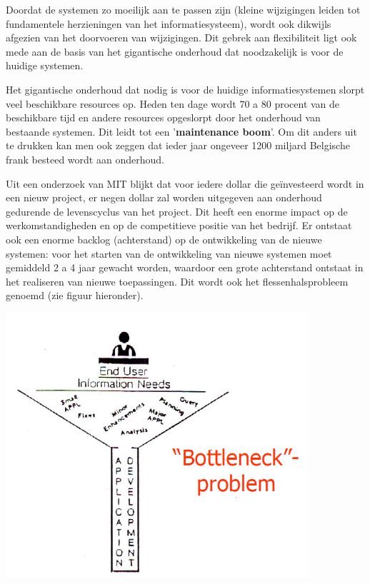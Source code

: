 Doordat de systemen zo moeilijk aan te passen zijn (kleine wijzigingen leiden tot fundamentele herzieningen van het informatiesysteem), wordt ook dikwijls afgezien van het doorvoeren van wijzigingen.
Dit gebrek aan flexibiliteit ligt ook mede aan de basis van het gigantische onderhoud dat noodzakelijk is voor de huidige systemen.


Het gigantische onderhoud dat nodig is voor de huidige informatiesystemen slorpt veel beschikbare resources op. Heden ten dage wordt 70 a 80 procent van de beschikbare tijd en andere resources opgeslorpt door het onderhoud van bestaande systemen. Dit leidt tot een '\textbf{maintenance boom}'. Om dit anders uit te drukken kan men ook zeggen dat ieder jaar ongeveer 1200 miljard Belgische frank besteed wordt aan onderhoud.

Uit een onderzoek van MIT blijkt dat voor iedere dollar die geïnvesteerd wordt in een nieuw project, er negen dollar zal worden uitgegeven aan onderhoud gedurende de levenscyclus van het project. Dit heeft een enorme impact op de werkomstandigheden en op de competitieve positie van het bedrijf. Er ontstaat ook een enorme backlog (achterstand) op de ontwikkeling van de nieuwe systemen: voor het starten van de ontwikkeling van nieuwe systemen moet gemiddeld 2 a 4 jaar gewacht worden, waardoor een grote achterstand ontstaat in het realiseren van nieuwe toepassingen. Dit wordt ook het flessenhalsprobleem genoemd (zie figuur hieronder).


\begin{center}
\includegraphics[width=4.4in]{img/bottleneck}%
\end{center}

